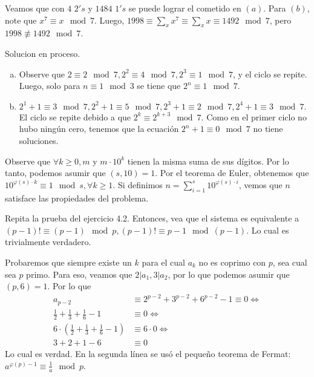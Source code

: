\begin{sol}
	Veamos que con $4$ $2's$ y $1484$ $1's$ se puede lograr el cometido en $(a)$. Para $(b)$, note que $x^{7} \equiv x \mod 7$. Luego, $1998 \equiv \sum_{x} x^{7} \equiv \sum_{x} x \equiv 1492 \mod 7$, pero $1998 \not\equiv 1492 \mod 7$.
\end{sol}

\begin{sol}
	Solucion en proceso.
\end{sol}

\begin{sol}
	\begin{enumerate}[a.]
		\item Observe que $2 \equiv 2 \mod 7, 2^2 \equiv 4 \mod 7, 2^3 \equiv 1 \mod 7$, y el ciclo se repite. Luego, solo para $n \equiv 1 \mod 3 $ se tiene que $2^n \equiv 1 \mod 7$.
		\item$ 2^1 +1 \equiv 3 \mod 7, 2^2+1 \equiv 5 \mod 7, 2^3 +1 \equiv 2 \mod 7, 2^4+1 \equiv 3 \mod 7. $ El ciclo se repite debido a que $2^k \equiv 2^{k+3} \mod 7$. Como en el primer ciclo no hubo ning\'un cero, tenemos que la ecuaci\'on $2^n +1 \equiv 0 \mod 7 $ no tiene soluciones.
	\end{enumerate}
\end{sol}

\begin{sol}
	Observe que $\forall k \geq 0, m $ y $ m\cdot 10^{k}$ tienen la misma suma de sus d\'igitos. Por lo tanto, podemos asumir que $(s, 10) = 1$. Por el teorema de Euler, obtenemos que $10^{\varphi(s)\cdot k } \equiv 1 \mod s, \forall k \geq 1$. Si definimos $n = \sum_{i=1}^{s} 10^{\varphi(s) \cdot i}$, vemos que $n$ satisface las propiedades del problema.
\end{sol}

\begin{sol}
	Repita la prueba del ejercicio 4.2. Entonces, vea que el sistema es equivalente a $(p-1)! \equiv (p-1) \mod p, (p-1)! \equiv p-1 \mod (p-1)$. Lo cual es trivialmente verdadero.
\end{sol}

\begin{sol}
	Probaremos que siempre existe un $k$ para el cual $a_{k}$ no es coprimo con $p$, sea cual sea $p$ primo. Para eso, veamos que $2|a_{1}, 3|a_{2}$, por lo que podemos asumir que $(p, 6) = 1$. Por lo que 
	\begin{align}
	a_{p-2} &\equiv 2^{p-2} + 3^{p-2} + 6^{p-2} -1 \equiv 0 \iff \\
	\frac{1}{2}+\frac{1}{3}+\frac{1}{6}-1 &\equiv 0 \iff \\
	6 \cdot ( \frac{1}{2}+\frac{1}{3}+\frac{1}{6}-1) &\equiv 6 \cdot 0 \iff \\
	3 + 2 + 1 - 6 &\equiv 0
	\end{align}
	Lo cual es verdad. En la segunda l\'inea se us\'o el pequeño teorema de Fermat: $a^{\varphi(p)-1} \equiv \frac{1}{a} \mod p$.
\end{sol}

